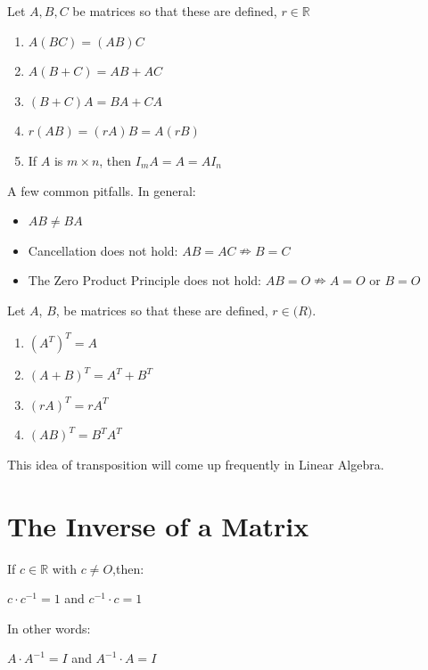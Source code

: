 \documentclass{report}
\begin{document}
\begin{theorem}
Let $A, B, C$ be matrices so that these are defined, $r \in \mathbb{R}$
\begin{enumerate}
	\item $A(BC) = (AB)C$
	\item $A(B + C) = AB + AC$
	\item $(B + C)A = BA + CA$
	\item $r(AB) = (rA)B = A(rB)$
	\item If $A$ is $m \times n$, then $I_mA = A = AI_n$
\end{enumerate}
\end{theorem}
\noindent A few common pitfalls. In general:
\begin{itemize}
	\item $AB \neq BA$
	\item Cancellation does not hold: $AB = AC \nRightarrow B = C$
	\item The Zero Product Principle does not hold: $AB = O \nRightarrow A = O$ or $B = O$
\end{itemize}
\begin{theorem}
Let $A$, $B$, be matrices so that these are defined, $r \in \mathbb(R)$.
\begin{enumerate}
	\item $(A^T)^T = A$
	\item $(A + B)^T = A^T + B^T$
	\item $(rA)^T = rA^T$
	\item $(AB)^T = B^TA^T$
\end{enumerate}
\end{theorem}

\begin{remark}
This idea of transposition will come up frequently in Linear Algebra.
\end{remark}
\section{The Inverse of a Matrix}
\begin{definition}
If $c \in \mathbb{R}$ with $c \neq O$,then:
\begin{center}
$c \cdot c^{-1} = 1$ and $c^{-1} \cdot c = 1$
\end{center}
In other words:
\begin{center}
	$A \cdot A^{-1} = I$ and $A^{-1} \cdot A = I$
\end{center}
\end{definition}
\end{document}
